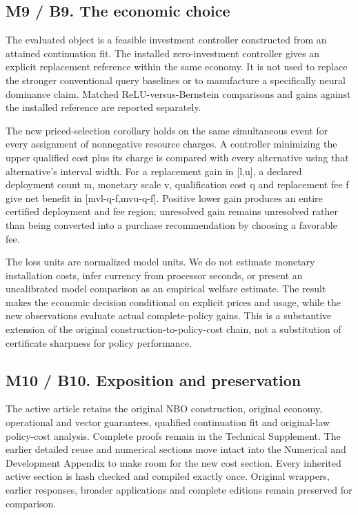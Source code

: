 \documentclass[ecta,nameyear,draft]{econsocart}
\begin{document}
\hypertarget{m9-b9.-the-economic-choice}{%
\subsection{M9 / B9. The economic
choice}\label{m9-b9.-the-economic-choice}}

The evaluated object is a feasible investment controller constructed
from an attained continuation fit. The installed zero-investment
controller gives an explicit replacement reference within the same
economy. It is not used to replace the stronger conventional query
baselines or to manufacture a specifically neural dominance claim.
Matched ReLU-versus-Bernstein comparisons and gains against the
installed reference are reported separately.

The new priced-selection corollary holds on the same simultaneous event
for every assignment of nonnegative resource charges. A controller
minimizing the upper qualified cost plus its charge is compared with
every alternative using that alternative's interval width. For a
replacement gain in {[}l,u{]}, a declared deployment count m, monetary
scale v, qualification cost q and replacement fee f give net benefit in
{[}mvl-q-f,mvu-q-f{]}. Positive lower gain produces an entire certified
deployment and fee region; unresolved gain remains unresolved rather
than being converted into a purchase recommendation by choosing a
favorable fee.

The loss units are normalized model units. We do not estimate monetary
installation costs, infer currency from processor seconds, or present an
uncalibrated model comparison as an empirical welfare estimate. The
result makes the economic decision conditional on explicit prices and
usage, while the new observations evaluate actual complete-policy gains.
This is a substantive extension of the original
construction-to-policy-cost chain, not a substitution of certificate
sharpness for policy performance.

\hypertarget{m10-b10.-exposition-and-preservation}{%
\subsection{M10 / B10. Exposition and
preservation}\label{m10-b10.-exposition-and-preservation}}

The active article retains the original NBO construction, original
economy, operational and vector guarantees, qualified continuation fit
and original-law policy-cost analysis. Complete proofs remain in the
Technical Supplement. The earlier detailed reuse and numerical sections
move intact into the Numerical and Development Appendix to make room for
the new cost section. Every inherited active section is hash checked and
compiled exactly once. Original wrappers, earlier responses, broader
applications and complete editions remain preserved for comparison.
\end{document}
